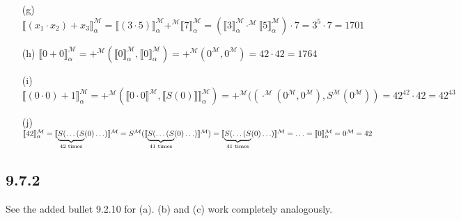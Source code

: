 \begin{enumerate}
\item[(g)] $\llbracket (x_1 \cdot x_2) +
  x_3\rrbracket_\alpha^\mathcal{M} = \llbracket(3 \cdot
  5)\rrbracket_\alpha^\mathcal{M} +^\mathcal{M}
  \llbracket7\rrbracket_\alpha^\mathcal{M} = (\llbracket
  3\rrbracket_\alpha^\mathcal{M} \cdot^\mathcal{M} \llbracket
  5\rrbracket_\alpha^\mathcal{M}) \cdot 7 = 3^5 \cdot 7 = 1701$

\item[(h)] $\llbracket
    0+0\rrbracket^\mathcal{M}_\alpha=+^\mathcal{M}(\llbracket
    0\rrbracket^\mathcal{M}_\alpha,\llbracket
    0\rrbracket^\mathcal{M}_\alpha)=+^\mathcal{M}(0^\mathcal{M},
    0^\mathcal{M})=42\cdot 42=1764$

\item[(i)] $\llbracket (0\cdot
  0)+1\rrbracket^\mathcal{M}_\alpha=+^\mathcal{M}(\llbracket 0\cdot
  0\rrbracket^\mathcal{M}, \llbracket
  S(0)\rrbracket\rrbracket^\mathcal{M}_\alpha)=+^\mathcal{M}((\cdot^\mathcal{M}(0^\mathcal{M},
  0^\mathcal{M}), S^\mathcal{M}(0^\mathcal{M}))=42^{42}\cdot
  42=42^{43}$

\item[(j)] $\llbracket
  42\rrbracket^\mathcal{M}_\alpha=\llbracket\underbrace{S(\mathellipsis(S}_{42\text{
      times}}(0)\mathellipsis)\rrbracket^\mathcal{M}=S^\mathcal{M}(\llbracket\underbrace{S(\mathellipsis(S}_{41\text{
      times}}(0)\mathellipsis)\rrbracket^\mathcal{M})=\llbracket\underbrace{S(\mathellipsis(S}_{41\text{
      times}}(0)\mathellipsis)\rrbracket^\mathcal{M}=\mathellipsis
    =\llbracket 0\rrbracket^\mathcal{M}_\alpha=0^\mathcal{M}=42$

\end{enumerate}

\subsection*{9.7.2}

See the added bullet 9.2.10 for (a). (b) and (c) work completely analogously.

